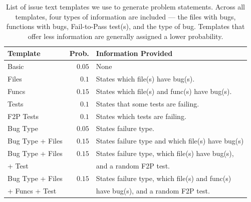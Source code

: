 \begin{table}[t]
    \centering
    \begin{tabular}{l|rl}
\toprule
Template & Prob. & Information Provided \\
\midrule
Basic            & $0.05$ & None \\
Files            & $0.1$  & States which file(s) have bug(s). \\
Funcs            & $0.15$ & States which file(s) and func(s) have bug(s). \\
Tests            & $0.1$  & States that some tests are failing. \\
F2P Tests        & $0.1$ & States which tests are failing. \\
Bug Type         & $0.05$ & States failure type. \\
Bug Type + Files & $0.15$ & States failure type and which file(s) have bug(s) \\
Bug Type + Files & $0.15$ & States failure type, which file(s) have bug(s), \\
\quad+ Test      &        & and a random F2P test. \\
Bug Type + Files & $0.15$ & States failure type, which file(s) and func(s) \\
\quad+ Funcs + Test &     & have bug(s), and a random F2P test. \\
\bottomrule
    \end{tabular}
    \caption{
    List of issue text templates we use to generate problem statements.
    Across all templates, four types of information are included --- the files with bugs, functions with bugs, Fail-to-Pass test(s), and the type of bug.
    Templates that offer less information are generally assigned a lower probability.
    }
    \label{tab:issue_gen_fixed}
\end{table}